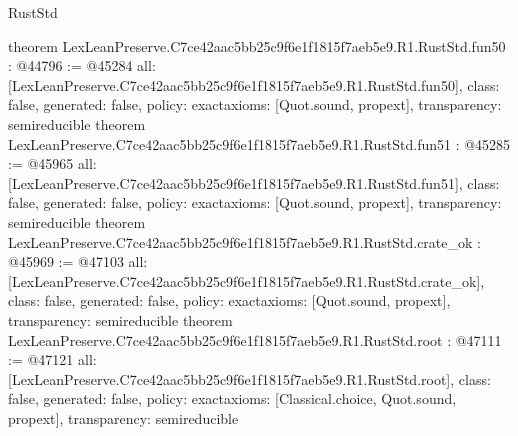 \begin{lexlean}{RustStd}
\begin{coremodule}
{}
theorem LexLeanPreserve.C7ce42aac5bb25c9f6e1f1815f7aeb5e9.R1.RustStd.fun50 : @44796 := @45284 {
  all: [LexLeanPreserve.C7ce42aac5bb25c9f6e1f1815f7aeb5e9.R1.RustStd.fun50],
  class: false,
  generated: false,
  policy: exact{axioms: [Quot.sound, propext]},
  transparency: semireducible
}
theorem LexLeanPreserve.C7ce42aac5bb25c9f6e1f1815f7aeb5e9.R1.RustStd.fun51 : @45285 := @45965 {
  all: [LexLeanPreserve.C7ce42aac5bb25c9f6e1f1815f7aeb5e9.R1.RustStd.fun51],
  class: false,
  generated: false,
  policy: exact{axioms: [Quot.sound, propext]},
  transparency: semireducible
}
theorem LexLeanPreserve.C7ce42aac5bb25c9f6e1f1815f7aeb5e9.R1.RustStd.crate_ok : @45969 := @47103 {
  all: [LexLeanPreserve.C7ce42aac5bb25c9f6e1f1815f7aeb5e9.R1.RustStd.crate_ok],
  class: false,
  generated: false,
  policy: exact{axioms: [Quot.sound, propext]},
  transparency: semireducible
}
theorem LexLeanPreserve.C7ce42aac5bb25c9f6e1f1815f7aeb5e9.R1.RustStd.root : @47111 := @47121 {
  all: [LexLeanPreserve.C7ce42aac5bb25c9f6e1f1815f7aeb5e9.R1.RustStd.root],
  class: false,
  generated: false,
  policy: exact{axioms: [Classical.choice, Quot.sound, propext]},
  transparency: semireducible
}


\end{coremodule}
\end{lexlean}
